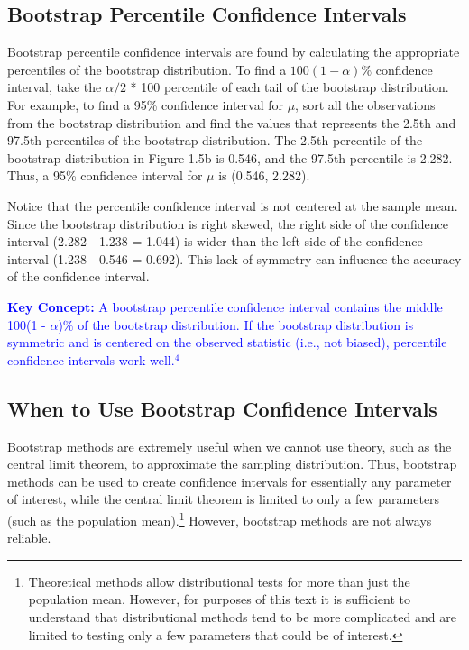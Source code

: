 \documentclass[
]{book}
\begin{document}
\hypertarget{bootstrap-percentile-confidence-intervals}{%
\subsection*{Bootstrap Percentile Confidence Intervals}\label{bootstrap-percentile-confidence-intervals}}

Bootstrap percentile confidence intervals are found by calculating the appropriate percentiles of the bootstrap distribution. To find a \(100(1 - \alpha)\%\) confidence interval, take the \(\alpha/2\) * 100 percentile of each tail of the bootstrap distribution. For example, to find a 95\% confidence interval for \(\mu\), sort all the observations from the bootstrap distribution and find the values that represents the 2.5th and 97.5th percentiles of the bootstrap distribution. The 2.5th percentile of the bootstrap distribution in Figure 1.5b is 0.546, and the 97.5th percentile is 2.282. Thus, a 95\% confidence interval for \(\mu\) is (0.546, 2.282).

Notice that the percentile confidence interval is not centered at the sample mean. Since the bootstrap distribution is right skewed, the right side of the confidence interval (2.282 - 1.238 = 1.044) is wider than the left side of the confidence interval (1.238 - 0.546 = 0.692). This lack of symmetry can influence the accuracy of the confidence interval.

\textbf{\textcolor{blue}{Key Concept:}}
\textcolor{blue}{A bootstrap percentile confidence interval contains the middle 100(1 - $\alpha$)$\%$ of the bootstrap distribution. If the bootstrap distribution is symmetric and is centered on the observed statistic (i.e., not biased), percentile confidence intervals work well.$^4$}

\hypertarget{when-to-use-bootstrap-confidence-intervals}{%
\subsection*{When to Use Bootstrap Confidence Intervals}\label{when-to-use-bootstrap-confidence-intervals}}

Bootstrap methods are extremely useful when we cannot use theory, such as the central limit theorem, to approximate the sampling distribution. Thus, bootstrap methods can be used to create confidence intervals for essentially any parameter of interest, while the central limit theorem is limited to only a few parameters (such as the population mean).\footnote{Theoretical methods allow distributional tests for more than just the population mean. However, for purposes of this text it is sufficient to understand that distributional methods tend to be more complicated and are limited to testing only a few parameters that could be of interest.} However, bootstrap methods are not always reliable.
\end{document}
